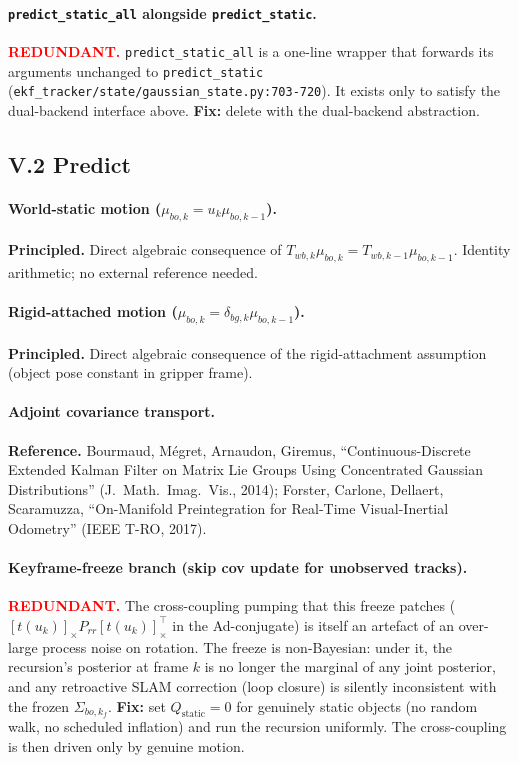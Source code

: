 \documentclass[11pt]{article}
\newcommand{\REDUNDANT}{\textcolor{red}{\textbf{REDUNDANT.}}}
\newcommand{\REFERENCE}{\textbf{Reference.}}
\newcommand{\PRINCIPLED}{\textbf{Principled.}}
\begin{document}
\paragraph{\texttt{predict\_static\_all} alongside \texttt{predict\_static}.}
\REDUNDANT{} \texttt{predict\_static\_all} is a one-line wrapper that
forwards its arguments unchanged to \texttt{predict\_static}
(\texttt{ekf\_tracker/state/gaussian\_state.py:703-720}). It exists
only to satisfy the dual-backend interface above.
\textbf{Fix:} delete with the dual-backend abstraction.

\subsection*{V.2 Predict}

\paragraph{World-static motion ($\mu_{bo,k}=u_k\mu_{bo,k-1}$).}
\PRINCIPLED{} Direct algebraic consequence of
$T_{wb,k}\mu_{bo,k}=T_{wb,k-1}\mu_{bo,k-1}$. Identity arithmetic; no
external reference needed.

\paragraph{Rigid-attached motion ($\mu_{bo,k}=\delta_{bg,k}\mu_{bo,k-1}$).}
\PRINCIPLED{} Direct algebraic consequence of the rigid-attachment
assumption (object pose constant in gripper frame).

\paragraph{Adjoint covariance transport.}
\REFERENCE{} Bourmaud, M\'egret, Arnaudon, Giremus, ``Continuous-Discrete
Extended Kalman Filter on Matrix Lie Groups Using Concentrated
Gaussian Distributions'' (J.~Math.~Imag.~Vis., 2014); Forster, Carlone,
Dellaert, Scaramuzza, ``On-Manifold Preintegration for Real-Time
Visual-Inertial Odometry'' (IEEE T-RO, 2017).

\paragraph{Keyframe-freeze branch (skip cov update for unobserved tracks).}
\REDUNDANT{} The cross-coupling pumping that this freeze patches
($[t(u_k)]_\times P_{rr}[t(u_k)]_\times^\top$ in the Ad-conjugate) is
itself an artefact of an over-large process noise on rotation. The
freeze is non-Bayesian: under it, the recursion's posterior at frame
$k$ is no longer the marginal of any joint posterior, and any
retroactive SLAM correction (loop closure) is silently inconsistent
with the frozen $\Sigma_{bo,k_f}$.
\textbf{Fix:} set $Q_{\text{static}}=0$ for genuinely static objects
(no random walk, no scheduled inflation) and run the recursion
uniformly. The cross-coupling is then driven only by genuine motion.
\end{document}
